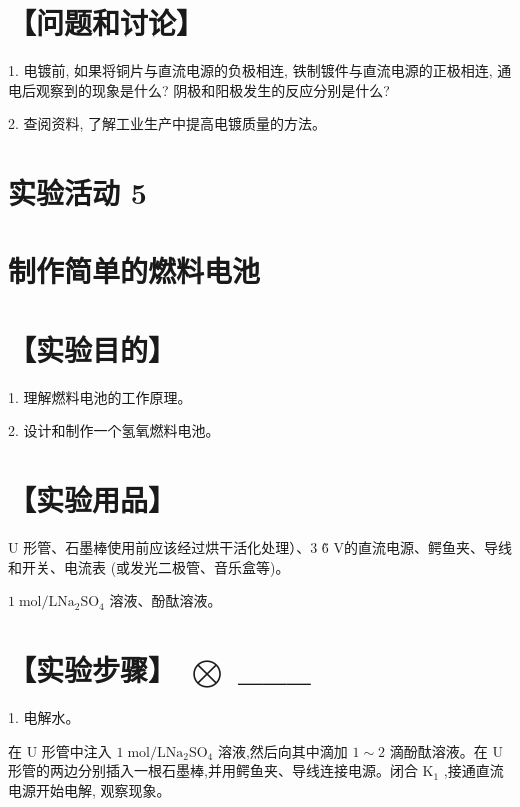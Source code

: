\documentclass[10pt]{article}
\begin{document}
\section*{【问题和讨论】}

1. 电镀前, 如果将铜片与直流电源的负极相连, 铁制镀件与直流电源的正极相连, 通电后观察到的现象是什么? 阴极和阳极发生的反应分别是什么?

2. 查阅资料, 了解工业生产中提高电镀质量的方法。


\section*{实验活动 5}

\section*{制作简单的燃料电池}

\section*{【实验目的】}

1. 理解燃料电池的工作原理。

2. 设计和制作一个氢氧燃料电池。

\section*{【实验用品】}

\(\mathrm{U}\) 形管、石墨棒使用前应该经过烘干活化处理）、3 \~6 V的直流电源、鳄鱼夹、导线和开关、电流表 (或发光二极管、音乐盒等)。

\(1\mathrm{\;{mol}}/\mathrm{L}{\mathrm{{Na}}}_{2}{\mathrm{{SO}}}_{4}\) 溶液、酚酞溶液。

\section*{【实验步骤】 \(\bigotimes\) \_\_\_}

1. 电解水。

在 \(\mathrm{U}\) 形管中注入 \(1\mathrm{\;{mol}}/\mathrm{L}{\mathrm{{Na}}}_{2}{\mathrm{{SO}}}_{4}\) 溶液,然后向其中滴加 \(1 \sim 2\) 滴酚酞溶液。在 \(\mathrm{U}\) 形管的两边分别插入一根石墨棒,并用鳄鱼夹、导线连接电源。闭合 \({\mathrm{K}}_{1}\) ,接通直流电源开始电解, 观察现象。
\end{document}
